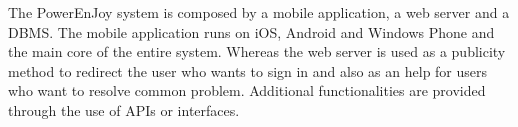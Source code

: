 The PowerEnJoy system is composed by a mobile application, a web server and a DBMS. The mobile application runs on iOS, Android and Windows Phone and the main core of the entire system. Whereas the web server is used as a publicity method to redirect the user who wants to sign in and also as an help for users who want to resolve common problem.  Additional functionalities are provided through the use of APIs or interfaces.